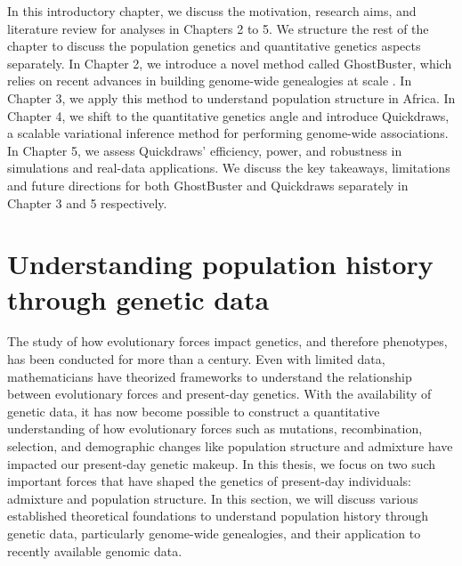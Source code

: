 In this introductory chapter, we discuss the motivation, research aims, and literature review for analyses in Chapters 2 to 5. We structure the rest of the chapter to discuss the population genetics and quantitative genetics aspects separately. In Chapter 2, we introduce a novel method called GhostBuster, which relies on recent advances in building genome-wide genealogies at scale \cite{speidel2019method, Kelleher2019, zhang2023biobank}. In Chapter 3, we apply this method to understand population structure in Africa. In Chapter 4, we shift to the quantitative genetics angle and introduce Quickdraws, a scalable variational inference method for performing genome-wide associations. In Chapter 5, we assess Quickdraws' efficiency, power, and robustness in simulations and real-data applications. We discuss the key takeaways, limitations and future directions for both GhostBuster and Quickdraws separately in Chapter 3 and 5 respectively. 

\section{Understanding population history through genetic data}

The study of how evolutionary forces impact genetics, and therefore phenotypes, has been conducted for more than a century. Even with limited data, mathematicians have theorized frameworks to understand the relationship between evolutionary forces and present-day genetics. With the availability of genetic data, it has now become possible to construct a quantitative understanding of how evolutionary forces such as mutations, recombination, selection, and demographic changes like population structure and admixture have impacted our present-day genetic makeup. In this thesis, we focus on two such important forces that have shaped the genetics of present-day individuals: admixture and population structure. In this section, we will discuss various established theoretical foundations to understand population history through genetic data, particularly genome-wide genealogies, and their application to recently available genomic data.

